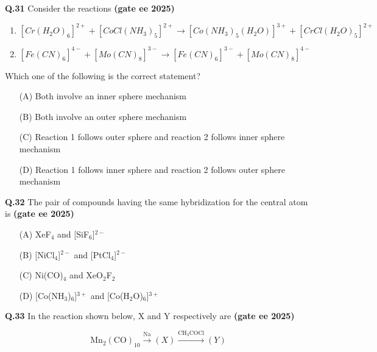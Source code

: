 \documentclass[journal,12pt,onecolumn]{exam}
\theoremstyle{remark}
\begin{document}
\noindent \textbf{Q.31} Consider the reactions \hfill{\textbf{(gate ee 2025)}}

\begin{enumerate}[label=\arabic*.]
\item \([Cr(H_2O)_6]^{2+} + [CoCl(NH_3)_5]^{2+} \rightarrow [Co(NH_3)_5(H_2O)]^{3+} + [CrCl(H_2O)_5]^{2+}\)
\item \([Fe(CN)_6]^{4-} + [Mo(CN)_8]^{3-} \rightarrow [Fe(CN)_6]^{3-} + [Mo(CN)_8]^{4-}\)
\end{enumerate}

Which one of the following is the correct statement?  

\begin{multicols}{2}
\begin{enumerate}[label=(\Alph*)]
\item[(A)] Both involve an inner sphere mechanism  
\item[(B)] Both involve an outer sphere mechanism  
\vspace{0.5 cm}
\item[(C)] Reaction 1 follows outer sphere and reaction 2 follows inner sphere mechanism  
\item[(D)] Reaction 1 follows inner sphere and reaction 2 follows outer sphere mechanism  
\end{enumerate}
\end{multicols}
\vspace{0.5cm}

\noindent \textbf{Q.32} The pair of compounds having the same hybridization for the central atom is  \hfill{\textbf{(gate ee 2025)}}

\begin{multicols}{2}
\begin{enumerate}[label=(\Alph*)]
\item[(A)] XeF$_4$ and [SiF$_6$]$^{2-}$  
\item[(B)] [NiCl$_4$]$^{2-}$ and [PtCl$_4$]$^{2-}$  
\item[(C)] Ni(CO)$_4$ and XeO$_2$F$_2$  
\item[(D)] [Co(NH$_3$)$_6$]$^{3+}$ and [Co(H$_2$O)$_6$]$^{3+}$  
\end{enumerate}
\end{multicols}
\vspace{0.5cm}

\noindent \textbf{Q.33} In the reaction shown below, X and Y respectively are  \hfill{\textbf{(gate ee 2025)}}

\[
\text{Mn}_2(\text{CO})_{10} \xrightarrow{\text{Na}} (X) \xrightarrow{\text{CH}_3\text{COCl}} (Y)
\]
\end{document}
